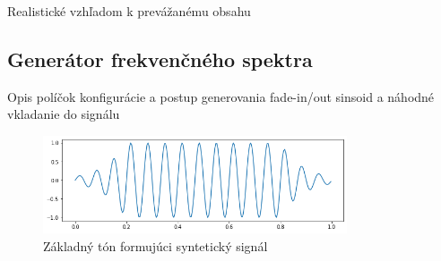 Realistické vzhľadom k prevážanému obsahu

\subsection{Generátor frekvenčného spektra}
Opis políčok konfigurácie a postup generovania fade-in/out sinsoid a náhodné vkladanie do signálu

\begin{figure}[h]
   \centering
    \includegraphics[width=0.8\textwidth]{figures/verification/fade-in-sinusoid.png}
   \caption{Základný tón formujúci syntetický signál}
\end{figure} 
